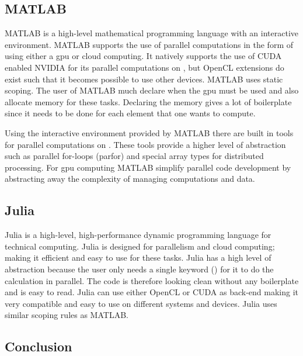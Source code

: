\subsection{MATLAB}
MATLAB is a high-level mathematical programming language with an interactive environment.
MATLAB supports the use of parallel computations in the form of using either a \acrshort{gpu} or cloud computing.
It natively supports the use of CUDA enabled NVIDIA  for its parallel computations on , but OpenCL extensions do exist such that it becomes possible to use other devices.
MATLAB uses static scoping. 
The user of MATLAB much declare when the \acrshort{gpu} must be used and also allocate memory for these tasks.
Declaring the memory gives a lot of boilerplate since it needs to be done for each element that one wants to compute. \citep{MATLAB_backend,MATLAB_benchmark}

Using the interactive environment provided by MATLAB there are built in tools for parallel computations on .
These tools provide a higher level of abstraction such as parallel for-loops (parfor) and special array types for distributed processing.
For \acrshort{gpu} computing MATLAB simplify parallel code development by abstracting away the complexity of managing computations and data. \citep{MATLAB_parallel}

\subsection{Julia}
Julia is a high-level, high-performance dynamic programming language for technical computing.
Julia is designed for parallelism and cloud computing; making it efficient and easy to use for these tasks.
Julia has a high level of abstraction because the user only needs a single keyword (\@parallel) for it to do the calculation in parallel.
The code is therefore looking clean without any boilerplate and is easy to read.
Julia can use either OpenCL or CUDA as back-end making it very compatible and easy to use on different systems and devices.
Julia uses similar scoping rules as MATLAB. \citep{Julia_Git, Julia_scope,Julia}

 

\subsection{Conclusion}  

